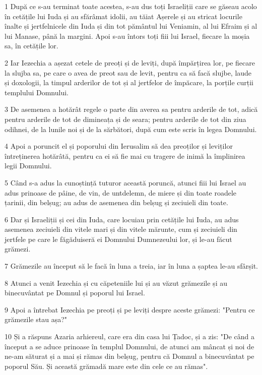 \par 1 După ce s-au terminat toate acestea, s-au dus toți Israeliții care se găseau acolo în cetățile lui Iuda și au sfărâmat idolii, au tăiat Așerele și au stricat locurile înalte și jertfelnicele din Iuda și din tot pământul lui Veniamin, al lui Efraim și al lui Manase, până la margini. Apoi s-au întors toți fiii lui Israel, fiecare la moșia sa, în cetățile lor.
\par 2 Iar Iezechia a așezat cetele de preoți și de leviți, după împărțirea lor, pe fiecare la slujba sa, pe care o avea de preot sau de levit, pentru ca să facă slujbe, laude și doxologii, la timpul arderilor de tot și al jertfelor de împăcare, la porțile curții templului Domnului.
\par 3 De asemenea a hotărât regele o parte din averea sa pentru arderile de tot, adică pentru arderile de tot de dimineața și de seara; pentru arderile de tot din ziua odihnei, de la lunile noi și de la sărbători, după cum este scris în legea Domnului.
\par 4 Apoi a poruncit el și poporului din Ierusalim să dea preoților și leviților întreținerea hotărâtă, pentru ca ei să fie mai cu tragere de inimă la împlinirea legii Domnului.
\par 5 Când s-a adus la cunoștință tuturor această poruncă, atunci fiii lui Israel au adus prinoase de pâine, de vin, de untdelemn, de miere și din toate roadele țarinii, din belșug; au adus de asemenea din belșug și zeciuieli din toate.
\par 6 Dar și Israeliții și cei din Iuda, care locuiau prin cetățile lui Iuda, au adus asemenea zeciuieli din vitele mari și din vitele mărunte, cum și zeciuieli din jertfele pe care le făgăduiseră ei Domnului Dumnezeului lor, și le-au făcut grămezi.
\par 7 Grămezile au început să le facă în luna a treia, iar în luna a șaptea le-au sfârșit.
\par 8 Atunci a venit Iezechia și cu căpeteniile lui și au văzut grămezile și au binecuvântat pe Domnul și poporul lui Israel.
\par 9 Apoi a întrebat Iezechia pe preoți și pe leviți despre aceste grămezi: "Pentru ce grămezile stau așa?"
\par 10 Și a răspuns Azaria arhiereul, care era din casa lui Țadoc, și a zis: "De când a început a se aduce prinoase în templul Domnului, de atunci am mâncat și noi de ne-am săturat și a mai și rămas din belșug, pentru că Domnul a binecuvântat pe poporul Său. Și această grămadă mare este din cele ce au rămas".
